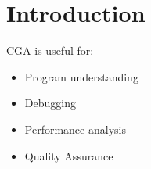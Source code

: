
\section{Introduction}

CGA is useful for:

\begin{itemize}
	\item Program understanding
	\item Debugging
	\item Performance analysis
	\item Quality Assurance
\end{itemize}

